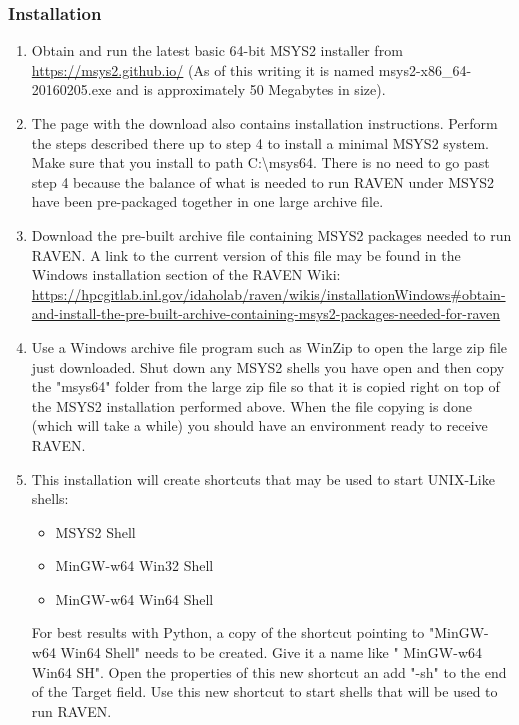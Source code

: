 \subsubsection{Installation}
\begin{enumerate}
    \item Obtain and run the latest basic 64-bit MSYS2 installer from \url{ https://msys2.github.io/} (As of this writing it is named
	msys2-x86\_64-20160205.exe and is approximately 50 Megabytes in size).
    \item The page with the download also contains installation instructions. Perform the steps described there up to
	step 4 to install a minimal MSYS2 system. Make sure that you install to path C:\textbackslash{}msys64. There
	is no need to go past step 4 because the balance of what is needed to run RAVEN under MSYS2 have been
	pre-packaged together in one large archive file.
    \item Download the pre-built archive file containing MSYS2 packages needed to run RAVEN.  A link to the current version of
	this file may be found in the Windows installation section of the RAVEN Wiki:
	\url{https://hpcgitlab.inl.gov/idaholab/raven/wikis/installationWindows#obtain-and-install-the-pre-built-archive-containing-msys2-packages-needed-for-raven}
    \item Use a Windows archive file program such as WinZip to open the large zip file just downloaded.  Shut down any
	MSYS2 shells you have open and then copy the "msys64" folder from the large zip file so that it is copied right
	on top of the MSYS2 installation performed above. When the file copying is done (which will take a while)
	you should have an environment ready to receive RAVEN.
    \item This installation will create shortcuts that may be used to start UNIX-Like shells:
	\begin{itemize}
	    \item MSYS2 Shell
	    \item MinGW-w64 Win32 Shell
	    \item MinGW-w64 Win64 Shell
	\end{itemize}
	For best results with Python, a copy of the shortcut pointing to  "MinGW-w64 Win64 Shell" needs to be created. Give
	it a name like " MinGW-w64 Win64 SH".  Open the properties of this new shortcut an add "-sh" to the end of the Target
	field.  Use this new shortcut to start shells that will be used to run RAVEN.
\end{enumerate}



